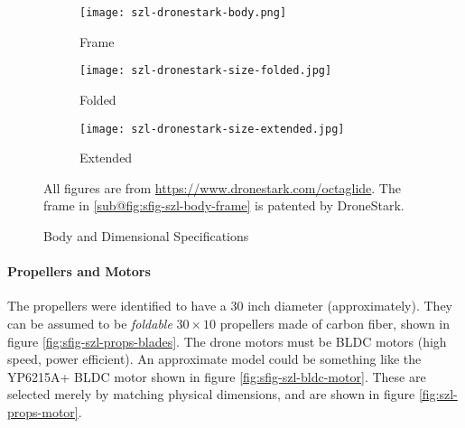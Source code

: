 \begin{figure}[ht]
    \centering
    \begin{subfigure}[b]{0.3\textwidth}
        \texttt{[image: szl-dronestark-body.png]}
        \caption{Frame}
        \label{fig:sfig-szl-body-frame}
    \end{subfigure}
    \begin{subfigure}[b]{0.3\textwidth}
        \texttt{[image: szl-dronestark-size-folded.jpg]}
        \caption{Folded}
        \label{fig:sfig-szl-size-folded}
    \end{subfigure}
    \begin{subfigure}[b]{0.3\textwidth}
        \texttt{[image: szl-dronestark-size-extended.jpg]}
        \caption{Extended}
        \label{fig:sfig-szl-size-extended}
    \end{subfigure}
    \caption{Body and Dimensional Specifications}
    \label{fig:szl-body-specs}
    \small
        All figures are from \url{https://www.dronestark.com/octaglide}. The frame in \ref{sub@fig:sfig-szl-body-frame} is patented by DroneStark.
\end{figure}

\paragraph*{Propellers and Motors}
The propellers were identified to have a $30$ inch diameter (approximately). They can be assumed to be \emph{foldable} $30\times10$ propellers made of carbon fiber, shown in figure \ref{fig:sfig-szl-props-blades}. The drone motors must be BLDC motors (high speed, power efficient). An approximate model could be something like the YP6215A+ BLDC motor shown in figure \ref{fig:sfig-szl-bldc-motor}. These are selected merely by matching physical dimensions, and are shown in figure \ref{fig:szl-props-motor}.

